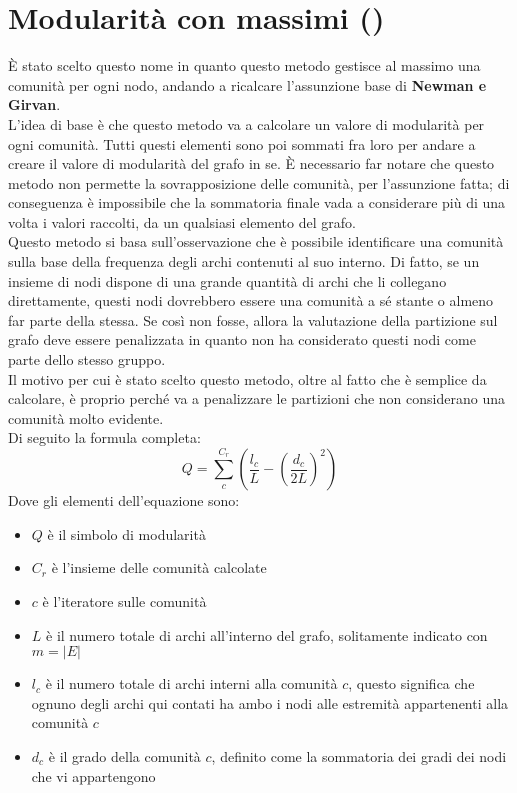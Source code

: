 \section{Modularità con massimi (\mmax)}
È stato scelto questo nome in quanto questo metodo gestisce al massimo una comunità per ogni nodo, andando a ricalcare l'assunzione base di \textbf{Newman e Girvan}.\\
L'idea di base è che questo metodo va a calcolare un valore di modularità per ogni comunità. Tutti questi elementi sono poi sommati fra loro per andare a creare il valore di modularità del grafo in se. È necessario far notare che questo metodo non permette la sovrapposizione delle comunità, per l'assunzione fatta; di conseguenza è impossibile che la sommatoria finale vada a considerare più di una volta i valori raccolti, da un qualsiasi elemento del grafo.\\
Questo metodo si basa sull'osservazione che è possibile identificare una comunità sulla base della frequenza degli archi contenuti al suo interno. Di fatto, se un insieme di nodi dispone di una grande quantità di archi che li collegano direttamente, questi nodi dovrebbero essere una comunità a sé stante o almeno far parte della stessa. Se così non fosse, allora la valutazione della partizione sul grafo deve essere penalizzata in quanto non ha considerato questi nodi come parte dello stesso gruppo.\\
Il motivo per cui è stato scelto questo metodo, oltre al fatto che è semplice da calcolare, è proprio perché va a penalizzare le partizioni che non considerano una comunità molto evidente.\\
Di seguito la formula completa:
\begin{equation}
	Q=\sum_{c}^{C_r} \left( \frac{l_c}{L}-\left(\frac{d_c}{2L} \right)^2 \right)
	\label{eq:m_max}
\end{equation}
Dove gli elementi dell'equazione sono:
\begin{itemize}
	\item $Q$ è il simbolo di modularità
	\item $C_r$ è l'insieme delle comunità calcolate
	\item $c$ è l'iteratore sulle comunità
	\item $L$ è il numero totale di archi all'interno del grafo, solitamente indicato con $m=|E|$
	\item $l_c$ è il numero totale di archi interni alla comunità $c$, questo significa che ognuno degli archi qui contati ha ambo i nodi alle estremità appartenenti alla comunità $c$
	\item $d_c$ è il grado della comunità $c$, definito come la sommatoria dei gradi dei nodi che vi appartengono
\end{itemize}
